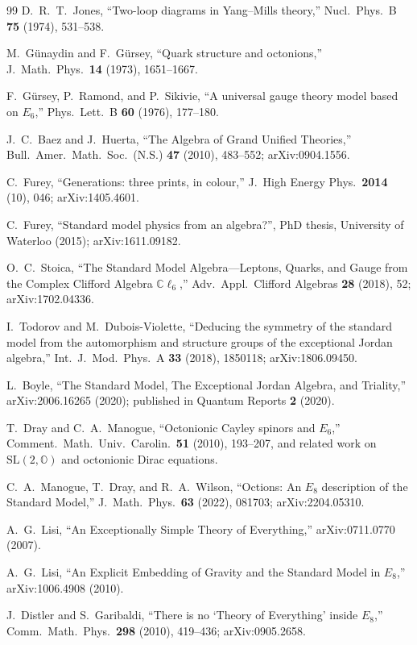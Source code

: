 \documentclass[aps,prresearch,onecolumn,amsmath,amssymb,nofootinbib]{revtex4-2}
\theoremstyle{plain}\newtheorem{theorem}{Theorem}[section]\newtheorem{proposition}[theorem]{Proposition}\newtheorem{lemma}[theorem]{Lemma}\newtheorem{corollary}[theorem]{Corollary}
\theoremstyle{definition}\newtheorem{definition}[theorem]{Definition}\newtheorem{conjecture}[theorem]{Conjecture}
\theoremstyle{remark}\newtheorem{remark}[theorem]{Remark}
\begin{document}
\begin{thebibliography}{99}
 D.~R.~T.~Jones, ``Two-loop diagrams in Yang--Mills theory,'' Nucl.\ Phys.\ B \textbf{75} (1974), 531--538.

 M.~G\"unaydin and F.~G\"ursey, ``Quark structure and octonions,'' J.\ Math.\ Phys.\ \textbf{14} (1973), 1651--1667.

 F.~G\"ursey, P.~Ramond, and P.~Sikivie, ``A universal gauge theory model based on $E_6$,'' Phys.\ Lett.\ B \textbf{60} (1976), 177--180.

 J.~C.~Baez and J.~Huerta, ``The Algebra of Grand Unified Theories,'' Bull.\ Amer.\ Math.\ Soc.\ (N.S.) \textbf{47} (2010), 483--552; arXiv:0904.1556.

 C.~Furey, ``Generations: three prints, in colour,'' J.\ High Energy Phys.\ \textbf{2014} (10), 046; arXiv:1405.4601.

 C.~Furey, ``Standard model physics from an algebra?'', PhD thesis, University of Waterloo (2015); arXiv:1611.09182.

 O.~C.~Stoica, ``The Standard Model Algebra---Leptons, Quarks, and Gauge from the Complex Clifford Algebra $\mathbb{C}\ell_6$,'' Adv.\ Appl.\ Clifford Algebras \textbf{28} (2018), 52; arXiv:1702.04336.

 I.~Todorov and M.~Dubois-Violette, ``Deducing the symmetry of the standard model from the automorphism and structure groups of the exceptional Jordan algebra,'' Int.\ J.\ Mod.\ Phys.\ A \textbf{33} (2018), 1850118; arXiv:1806.09450.

 L.~Boyle, ``The Standard Model, The Exceptional Jordan Algebra, and Triality,'' arXiv:2006.16265 (2020); published in Quantum Reports \textbf{2} (2020).

 T.~Dray and C.~A.~Manogue, ``Octonionic Cayley spinors and $E_6$,'' Comment.\ Math.\ Univ.\ Carolin.\ \textbf{51} (2010), 193--207, and related work on $\mathrm{SL}(2,\mathbb{O})$ and octonionic Dirac equations.

 C.~A.~Manogue, T.~Dray, and R.~A.~Wilson, ``Octions: An $E_8$ description of the Standard Model,'' J.\ Math.\ Phys.\ \textbf{63} (2022), 081703; arXiv:2204.05310.

 A.~G.~Lisi, ``An Exceptionally Simple Theory of Everything,'' arXiv:0711.0770 (2007).

 A.~G.~Lisi, ``An Explicit Embedding of Gravity and the Standard Model in $E_8$,'' arXiv:1006.4908 (2010).

 J.~Distler and S.~Garibaldi, ``There is no `Theory of Everything' inside $E_8$,'' Comm.\ Math.\ Phys.\ \textbf{298} (2010), 419--436; arXiv:0905.2658.

\end{thebibliography}
\end{document}
